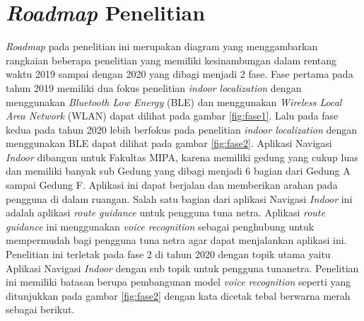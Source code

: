\section{\textit{Roadmap} Penelitian}
\textit{Roadmap} pada penelitian ini merupakan diagram yang menggambarkan rangkaian beberapa penelitian yang memiliki kesinambungan dalam rentang waktu 2019 sampai dengan 2020 yang dibagi menjadi 2 fase. Fase pertama pada tahun 2019 memiliki dua fokus penelitian \textit{indoor localization} dengan menggunakan \textit{Bluetooth Low Energy} (BLE) dan menggunakan \textit{Wireless Local Area Network} (WLAN) dapat dilihat pada gambar \ref{fig:fase1}. Lalu pada fase kedua pada tahun 2020 lebih berfokus pada penelitian \textit{indoor localization} dengan menggunakan BLE dapat dilihat pada gambar \ref{fig:fase2}. Aplikasi Navigasi \textit{Indoor} dibangun untuk Fakultas MIPA, karena memiliki gedung yang cukup luas dan memiliki banyak sub Gedung yang dibagi menjadi 6 bagian dari Gedung A sampai Gedung F. Aplikasi ini dapat berjalan dan memberikan arahan pada pengguna di dalam ruangan. Salah satu bagian dari aplikasi Navigasi \textit{Indoor} ini adalah aplikasi \textit{route guidance} untuk pengguna tuna netra. Aplikasi \textit{route guidance} ini menggunakan \textit{voice recognition} sebagai penghubung untuk mempermudah bagi pengguna tuna netra agar dapat menjalankan aplikasi ini. Penelitian ini terletak pada fase 2 di tahun 2020 dengan topik utama yaitu Aplikasi Navigasi \textit{Indoor} dengan sub topik untuk pengguna tunanetra. Penelitian ini memiliki batasan berupa pembangunan model \textit{voice recognition} seperti yang ditunjukkan pada gambar \ref{fig:fase2} dengan kata dicetak tebal berwarna merah sebagai berikut.

\begin{figure}[H]
\end{figure}

